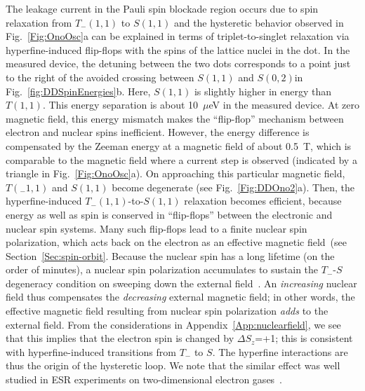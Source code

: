 \documentclass[12pt,aps,nofootinbib]{revtex4-1}
\begin{document}
The leakage current in the Pauli spin blockade region occurs due
to spin relaxation from $T_-(1,1)$ to $S(1,1)$ and the hysteretic
behavior observed in Fig.~\ref{Fig:OnoOsc}a can be explained in
terms of triplet-to-singlet relaxation via hyperfine-induced flip-flops with the spins of the lattice nuclei in the dot.
In the measured device, the detuning between the two dots corresponds to a point just to the right of the avoided crossing between $S(1,1)$ and $S(0,2)$in Fig.~\ref{fig:DDSpinEnergies}b. Here, $S(1,1)$ is slightly higher in energy than $T(1,1)$. This energy separation is about 10~$\mu$eV in the measured device. At zero magnetic field, this energy mismatch makes the ``flip-flop'' mechanism between electron and nuclear spins inefficient. However, the energy difference is compensated by the Zeeman energy at a magnetic field
of about 0.5~T, which is comparable to the magnetic field
where a current step is observed (indicated by a triangle in
Fig.~\ref{Fig:OnoOsc}a). On approaching this particular magnetic
field, $T(_-1,1)$ and $S(1,1)$ become degenerate (see
Fig.~\ref{Fig:DDOno2}a). Then, the hyperfine-induced $T_-(1,1)$-to-$S(1,1)$ relaxation becomes efficient, because energy as well as spin is
conserved in ``flip-flops'' between the electronic and nuclear spin systems. Many such flip-flops lead to a finite
nuclear spin polarization, which acts back on the electron as an effective magnetic field~(see Section~\ref{Sec:spin-orbit}. Because
the nuclear spin has a long lifetime (on the order of minutes), a
nuclear spin polarization accumulates to sustain the $T_-$-$S$
degeneracy condition on sweeping down the external
field~\cite{OnoPRL2004}. An \textit{increasing} nuclear field thus compensates the \textit{decreasing} external magnetic field; in other words, the effective
magnetic field resulting from nuclear spin polarization
\textit{adds} to the external field. From the considerations in
Appendix~\ref{App:nuclearfield}, we see that this implies that the electron spin is
changed by $\Delta S_z$=+1; this is consistent with
hyperfine-induced transitions from $T_-$ to $S$. The hyperfine
interactions are thus the origin of the hysteretic loop. We note
that the similar effect was well studied in ESR experiments on
two-dimensional electron gases~\cite{dobers88,Teraoka04}.
\end{document}

